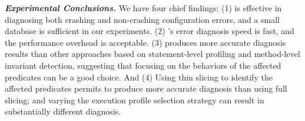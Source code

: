 \vspace{1mm}

\noindent \textbf{\textit{Experimental Conclusions.}} 
We have four chief findings: (1) \ourtool is effective
in diagnosing both crashing and non-crashing configuration errors,
and a small database is sufficient in our experiments.
(2) \ourtool's error diagnosis speed is fast, and the performance
overhead is acceptable.
(3) \ourtool produces more accurate diagnosis results than other
approaches based on statement-level profiling and method-level
invariant detection, suggesting that focusing on the behaviors
of the affected predicates can be a good choice.
And (4) Using thin slicing to identify the affected predicates
permits \ourtool to produce more accurate diagnosis than using
full slicing; and varying the execution profile selection
strategy can result in substantially different diagnosis.





